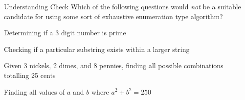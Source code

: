 \documentclass[pdf, aspectratio=169, 12pt]{beamer}
\begin{document}


\begin{frame}{Understanding Check}
	Which of the following questions would \emph{not} be a suitable candidate for using some sort of exhaustive enumeration type algorithm?
	\begin{poll}
	\item Determining if a 3 digit number is prime
	\item Checking if a particular substring exists within a larger string
	\item Given 3 nickels, 2 dimes, and 8 pennies, finding all possible combinations totalling 25 cents
	\item Finding all values of $a$ and $b$ where $a^2 + b^2 = 250$
	\end{poll}
\end{frame}
\end{document}
